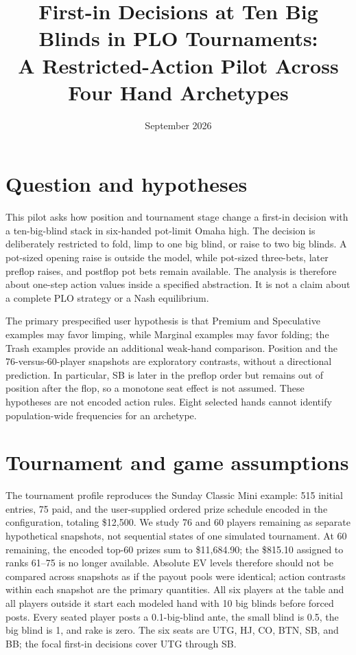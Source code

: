 \documentclass[10pt]{article}
\title{First-in Decisions at Ten Big Blinds in PLO Tournaments:\\
A Restricted-Action Pilot Across Four Hand Archetypes}
\author{}
\date{September 2026}
\begin{document}
\maketitle

\begin{abstract}

\end{abstract}

\section{Question and hypotheses}
This pilot asks how position and tournament stage change a first-in decision with a ten-big-blind
stack in six-handed pot-limit Omaha high. The decision is deliberately restricted to fold, limp to
one big blind, or raise to two big blinds. A pot-sized opening raise is outside the model, while
pot-sized three-bets, later preflop raises, and postflop pot bets remain available. The analysis is
therefore about one-step action values inside a specified abstraction. It is not a claim about a
complete PLO strategy or a Nash equilibrium.

The primary prespecified user hypothesis is that Premium and Speculative examples may favor
limping, while Marginal examples may favor folding; the Trash examples provide an additional
weak-hand comparison. Position and the 76-versus-60-player snapshots are exploratory contrasts,
without a directional prediction. In particular, SB is later in the preflop order but remains out
of position after the flop, so a monotone seat effect is not assumed. These hypotheses are not
encoded action rules. Eight selected hands cannot identify population-wide frequencies for an
archetype.

\section{Tournament and game assumptions}
The tournament profile reproduces the Sunday Classic Mini example: 515 initial entries, 75 paid,
and the user-supplied ordered prize schedule encoded in the configuration, totaling \$12,500. We
study 76 and 60 players remaining as separate hypothetical snapshots, not sequential states of one
simulated tournament. At 60 remaining, the encoded top-60 prizes sum to \$11,684.90; the \$815.10
assigned to ranks 61--75 is no longer available. Absolute EV levels therefore should not be compared
across snapshots as if the payout pools were identical; action contrasts within each snapshot are
the primary quantities.
All six players at the table and all players outside it start each modeled hand with 10 big blinds
before forced posts. Every seated player posts a 0.1-big-blind ante, the small blind is 0.5, the big
blind is 1, and rake is zero. The six seats are UTG, HJ, CO, BTN, SB, and BB; the focal first-in
decisions cover UTG through SB.
\end{document}
